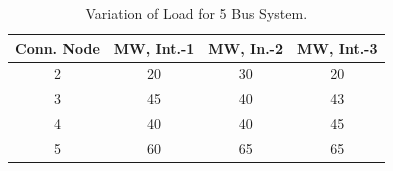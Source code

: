 \documentclass[preprint,12pt,3p]{elsarticle}
\begin{document}
\begin{table}[ht] 

\caption{Variation of Load for 5 Bus System.} %

\centering %

\begin{tabular}{| c | c | c | c |} %

\hline\hline %

Conn. Node & MW, Int.-1 & MW, In.-2 & MW, Int.-3 \\ [0.5ex] %


\hline %


2 & 20 & 30 & 20 \\ %
\hline
3 & 45 & 40 & 43 \\ [1ex] %

\hline %
4 & 40 & 40 & 45 \\ [1ex] %

\hline %
5 & 60 & 65 & 65 \\ [1ex] %

\hline %
\end{tabular} 

\label{table:5LASCOPFLoad} %

\end{table}
\fi
\end{document}
